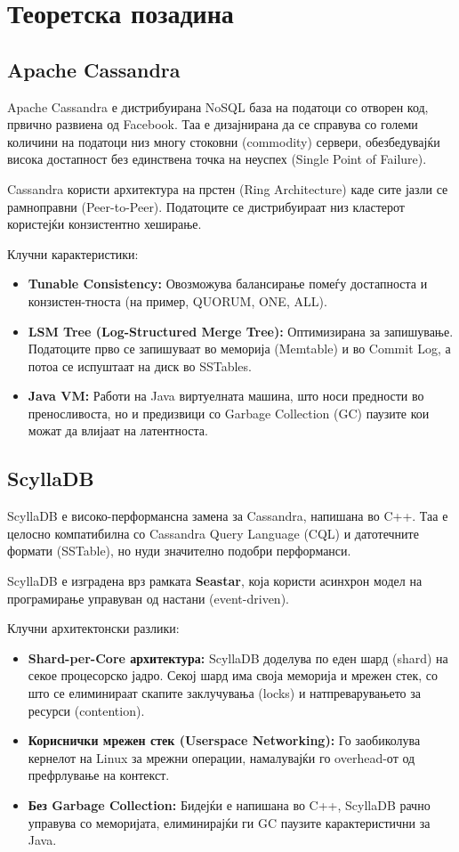 \section{Теоретска позадина}

\subsection{Apache Cassandra}
Apache Cassandra е дистрибуирана NoSQL база на податоци со отворен код, првично развиена од Facebook. 
Таа е дизајнирана да се справува со големи количини на податоци низ многу стоковни (commodity) сервери, 
обезбедувајќи висока достапност без единствена точка на неуспех (Single Point of Failure).

Cassandra користи архитектура на прстен (Ring Architecture) каде сите јазли се рамноправни (Peer-to-Peer). 
Податоците се дистрибуираат низ кластерот користејќи конзистентно хеширање.

Клучни карактеристики:
\begin{itemize}
    \item \textbf{Tunable Consistency:} Овозможува балансирање помеѓу достапноста и конзистен-тноста 
    (на пример, QUORUM, ONE, ALL).
    \item \textbf{LSM Tree (Log-Structured Merge Tree):} Оптимизирана за запишување. Податоците прво се 
    запишуваат во меморија (Memtable) и во Commit Log, а потоа се испуштаат на диск во SSTables.
    \item \textbf{Java VM:} Работи на Java виртуелната машина, што носи предности во преносливоста, но и 
    предизвици со Garbage Collection (GC) паузите кои можат да влијаат на латентноста.
\end{itemize}

\subsection{ScyllaDB}
ScyllaDB е високо-перформансна замена за Cassandra, напишана во C++. Таа е целосно компатибилна со 
Cassandra Query Language (CQL) и датотечните формати (SSTable), но нуди значително подобри перформанси.

ScyllaDB е изградена врз рамката \textbf{Seastar}, која користи асинхрон модел на програмирање управуван 
од настани (event-driven).

Клучни архитектонски разлики:
\begin{itemize}
    \item \textbf{Shard-per-Core архитектура:} ScyllaDB доделува по еден шард (shard) на секое процесорско 
    јадро. Секој шард има своја меморија и мрежен стек, со што се елиминираат скапите заклучувања (locks) 
    и натпреварувањето за ресурси (contention).
    \item \textbf{Кориснички мрежен стек (Userspace Networking):} Го заобиколува кернелот на Linux за 
    мрежни операции, намалувајќи го overhead-от од префрлување на контекст.
    \item \textbf{Без Garbage Collection:} Бидејќи е напишана во C++, ScyllaDB рачно управува со меморијата, 
    елиминирајќи ги GC паузите карактеристични за Java.
\end{itemize}

